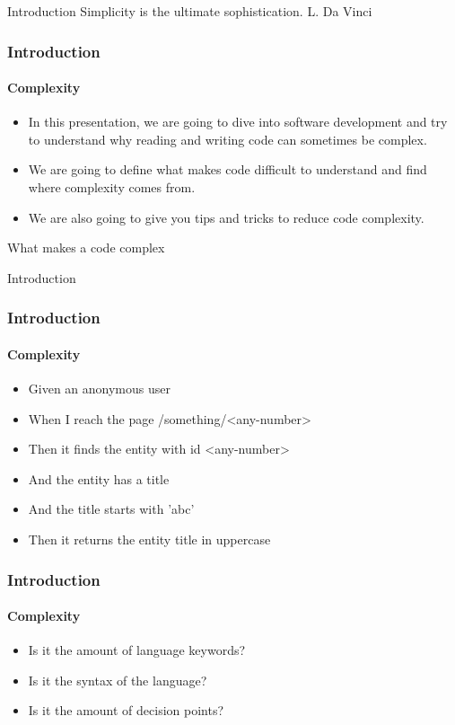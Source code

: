 \begin{sepframe}{Introduction}
    {\scriptsize{Simplicity is the ultimate sophistication. L. Da Vinci}}
\end{sepframe}

\begin{frame}
    \frametitle{Introduction}
    \framesubtitle{Complexity}

    \begin{itemize}[<+->]
        \item In this presentation, we are going to dive into software development
        and try to understand why reading and writing code can sometimes be
        complex.
        \item We are going to define what makes code difficult to understand and
        find where complexity comes from.
        \item We are also going to give you tips and tricks to reduce code complexity.
    \end{itemize}
\end{frame}

\begin{frame}
    What makes a code complex
\end{frame}

\begin{frame}{Introduction}
    \frametitle{Introduction}
    \framesubtitle{Complexity}

    \begin{itemize}[<+->]
        \item Given an anonymous user
        \item When I reach the page /something/<any-number>
        \item Then it finds the entity with id <any-number>
        \item And the entity has a title
        \item And the title starts with 'abc'
        \item Then it returns the entity title in uppercase
    \end{itemize}
\end{frame}

\begin{frame}[fragile,c]
    
\end{frame}

\begin{frame}
    \frametitle{Introduction}
    \framesubtitle{Complexity}

    \begin{itemize}[<+->]
        \item Is it the amount of language keywords?
        \item Is it the syntax of the language?
        \item Is it the amount of decision points?
    \end{itemize}
\end{frame}


